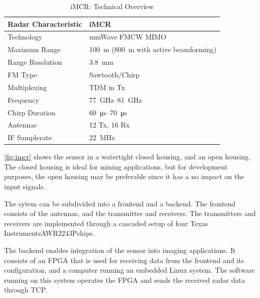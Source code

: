 \begin{table}[h]
    \centering
    \begin{tabular}{ll}
        \toprule
        \textbf{Radar Characteristic} & \textbf{iMCR  }                                     \\
        \midrule
        Technology                    & mmWave FMCW MIMO                                    \\
        Maximum Range                 & \SI{100}{\m} (\SI{800}{\m} with active beamforming) \\
        Range Resolution              & \SI{3.8}{\mm}                                       \\
        FM Type                       & Sawtooth/Chirp                                      \\
        Multiplexing                  & TDM in Tx                                           \\
        Frequency                     & \SIrange{77}{81}{\GHz}                              \\
        Chirp Duration                & \SIrange{60}{70}{\us}                               \\
        Antennas                      & 12 Tx, 16 Rx                                        \\
        IF Samplerate                 & \SI{22}{\MHz}                                       \\
        \bottomrule
    \end{tabular}
    \caption{iMCR: Technical Overview}
    \label{tab:imcr}
\end{table}

\cref{fig:imcr} shows the sensor in a watertight closed housing,
and an open housing. The closed housing is ideal for mining applications,
but for development purposes, the open housing may be preferable since it has a no impact on the input signals.

The sytem can be subdivided into a frontend and a backend.
The frontend consists of the antennas, and the transmitter and receivers.
The transmitters and receivers are implemented through a cascaded setup
of four Texas Instruments\textregistered AWR2243P\texttrademark chips.

The backend enables integration of the sensor into imaging applications.
It consists of an FPGA that is used for receiving data from the frontend
and its configuration, and a computer running an embedded Linux system.
The software running on this system operates the FPGA and
sends the received radar data through TCP.

